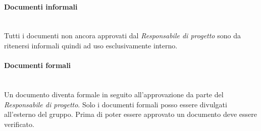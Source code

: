 \paragraph{Documenti informali}\mbox{}\\
Tutti i documenti non ancora approvati dal \textit{Responsabile di progetto} sono da ritenersi informali quindi ad uso esclusivamente interno.

\paragraph{Documenti formali}\mbox{}\\
Un documento diventa formale in seguito all'approvazione da parte del \textit{Responsabile di progetto}. Solo i documenti formali posso essere divulgati all'esterno del gruppo. Prima di poter essere approvato un documento deve essere verificato. 

